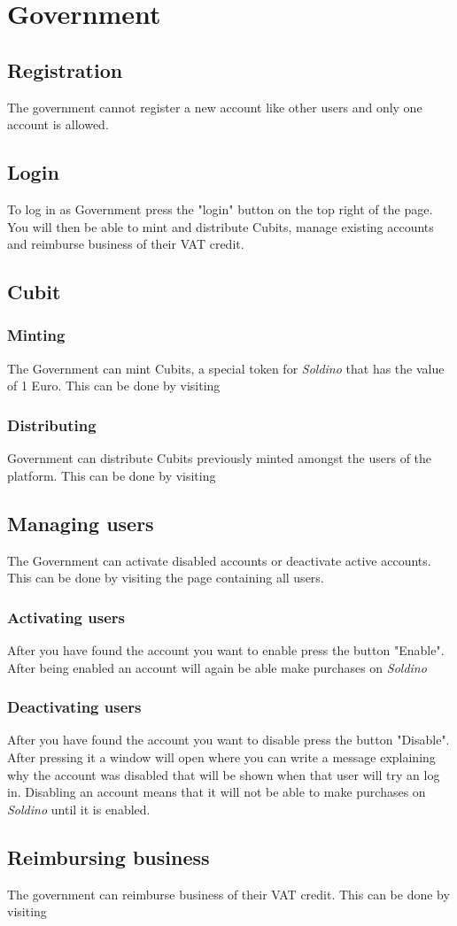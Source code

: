 \section{Government}
	\subsection{Registration}
	The government cannot register a new account like other users and only one 
	account is allowed. 
	\subsection{Login}
	To log in as Government press the "login" button on the top right of the 
	page. You will then be able to mint and distribute Cubits, manage existing accounts and reimburse business of their VAT credit.
	\subsection{Cubit}
		\subsubsection{Minting}
		The Government can mint Cubits, a special token for \textit{Soldino} 
		that has the value of 1 Euro. This can be done by visiting 
		\subsubsection{Distributing}
		Government can distribute Cubits previously minted amongst the users of 
		the platform. This can be done by visiting 
	\subsection{Managing users}
	The Government can activate disabled accounts or deactivate active accounts.
	This can be done by visiting the page containing all users.
		\subsubsection{Activating users}
		After you have found the account you want to enable press the button 
		"Enable". After being enabled an account will again be able make purchases
		on \textit{Soldino}
		\subsubsection{Deactivating users}
		After you have found the account you want to disable press the button 
		"Disable". After pressing it a window will open where you can write a
		message explaining why the account was disabled that will be shown 
		when that user will try an log in. Disabling an account means that it will not be able to make purchases on \textit{Soldino}
		until it is enabled.
	\subsection{Reimbursing business}
	The government can reimburse business of their VAT credit. This can be done 
	by visiting %